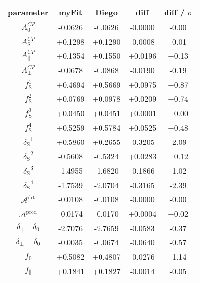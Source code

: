 \begin{table}
\centering
\footnotesize
\begin{tabular}{|c|c|c|c|c|}
 \hline
 parameter   &   myFit   &   Diego  &  diff   &  diff / $\sigma$ \\
 \hline
$A^{CP}_{0}$  & -0.0626 & -0.0626  & -0.0000  & -0.00   \\
$A^{CP}_{\text{S}}$  & +0.1298 & +0.1290  & -0.0008  & -0.01   \\
$A^{CP}_{\parallel}$  & +0.1354 & +0.1550  & +0.0196  & +0.13   \\
$A^{CP}_{\perp}$  & -0.0678 & -0.0868  & -0.0190  & -0.19   \\
$f_\text{S}^1$  & +0.4694 & +0.5669  & +0.0975  & +0.87   \\
$f_\text{S}^2$  & +0.0769 & +0.0978  & +0.0209  & +0.74   \\
$f_\text{S}^3$  & +0.0450 & +0.0451  & +0.0001  & +0.00   \\
$f_\text{S}^4$  & +0.5259 & +0.5784  & +0.0525  & +0.48   \\
${\delta_\text{S}}^1$  & +0.5860 & +0.2655  & -0.3205  & -2.09   \\
${\delta_\text{S}}^2$  & -0.5608 & -0.5324  & +0.0283  & +0.12   \\
${\delta_\text{S}}^3$  & -1.4955 & -1.6820  & -0.1866  & -1.02   \\
${\delta_\text{S}}^4$  & -1.7539 & -2.0704  & -0.3165  & -2.39   \\
$\mathcal{A}^{\text{det}}$  & -0.0108 & -0.0108  & -0.0000  & -0.00   \\
$\mathcal{A}^{\text{prod}}$  & -0.0174 & -0.0170  & +0.0004  & +0.02   \\
$\delta_\parallel-\delta_0$  & -2.7076 & -2.7659  & -0.0583  & -0.37   \\
$\delta_\perp-\delta_0$  & -0.0035 & -0.0674  & -0.0640  & -0.57   \\
$f_{0}^{\text{}}$  & +0.5082 & +0.4807  & -0.0276  & -1.14   \\
$f_{\parallel}$  & +0.1841 & +0.1827  & -0.0014  & -0.05   \\
    \hline
 \end{tabular}
\end{table}
